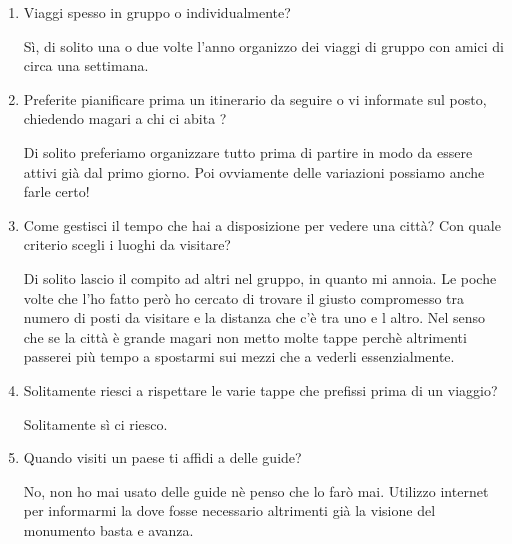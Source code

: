 

\begin{enumerate}

\item Viaggi spesso in gruppo o individualmente?

Sì, di solito una o due volte l'anno organizzo dei viaggi di gruppo con amici di circa una settimana.

\item Preferite pianificare prima un itinerario da seguire o vi informate sul posto, chiedendo magari a chi ci abita ?

Di solito preferiamo organizzare tutto prima di partire in modo da essere attivi già dal primo giorno. Poi ovviamente delle variazioni possiamo anche farle certo!

\item Come gestisci il tempo che hai a disposizione per vedere una città? Con quale criterio scegli i luoghi da visitare?

Di solito lascio il compito ad altri nel gruppo, in quanto mi annoia. Le poche volte che l'ho fatto però ho cercato di trovare il giusto compromesso tra numero di posti da visitare e la distanza che c'è tra uno e l altro. Nel senso che se la città è grande magari non metto molte tappe perchè altrimenti passerei più tempo a spostarmi sui mezzi che a vederli essenzialmente.

\item Solitamente riesci a rispettare le varie tappe che prefissi prima di un viaggio?

Solitamente sì ci riesco.

\item Quando visiti un paese ti affidi a delle guide?

No, non ho mai usato delle guide nè penso che lo farò mai. Utilizzo internet per informarmi la dove fosse necessario altrimenti già la visione del monumento basta e avanza.

\end{enumerate}

\clearpage
{}

